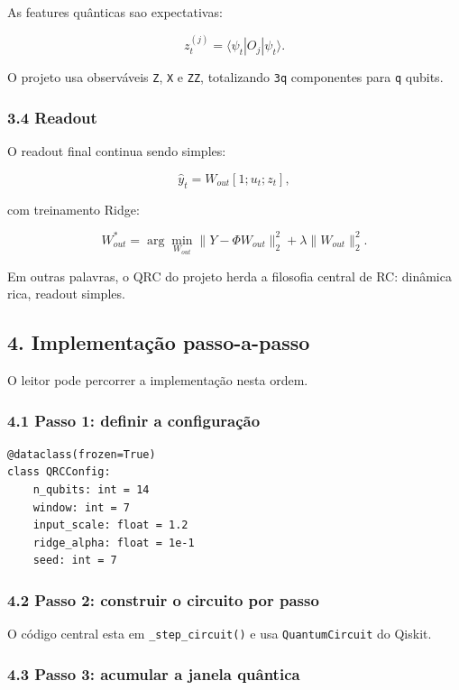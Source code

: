 \documentclass[12pt]{article}
\begin{document}
As features quânticas sao expectativas:

\[
z_t^{(j)} = \langle \psi_t | O_j | \psi_t \rangle.
\]

O projeto usa observáveis \texttt{Z}, \texttt{X} e \texttt{ZZ}, totalizando \texttt{3q} componentes para \texttt{q} qubits.

\subsubsection{3.4 Readout}\label{34-readout}

O readout final continua sendo simples:

\[
\hat{y}_t = W_{out} [1; u_t; z_t],
\]

com treinamento Ridge:

\[
W_{out}^* = \arg\min_{W_{out}} \|Y - \Phi W_{out}\|_2^2 + \lambda \|W_{out}\|_2^2.
\]

Em outras palavras, o QRC do projeto herda a filosofia central de RC: dinâmica rica, readout simples.

\subsection{4. Implementação passo-a-passo}\label{4-implementauxe7uxe3o-passo-a-passo}

O leitor pode percorrer a implementação nesta ordem.

\subsubsection{4.1 Passo 1: definir a configuração}\label{41-passo-1-definir-a-configurauxe7uxe3o}

\begin{verbatim}
@dataclass(frozen=True)
class QRCConfig:
    n_qubits: int = 14
    window: int = 7
    input_scale: float = 1.2
    ridge_alpha: float = 1e-1
    seed: int = 7
\end{verbatim}

\subsubsection{4.2 Passo 2: construir o circuito por passo}\label{42-passo-2-construir-o-circuito-por-passo}

O código central esta em \texttt{\_step\_circuit()} e usa \texttt{QuantumCircuit} do Qiskit.

\subsubsection{4.3 Passo 3: acumular a janela quântica}\label{43-passo-3-acumular-a-janela-quuxe2ntica}
\end{document}
